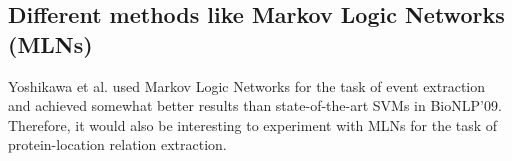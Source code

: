 \subsection{Different methods like Markov Logic Networks (MLNs)}


Yoshikawa et al. used Markov Logic Networks \cite{yoshikawa2011coreference} for the task of event extraction and achieved somewhat better results than state-of-the-art SVMs in BioNLP'09. Therefore, it would also be interesting to experiment with MLNs for the task of protein-location relation extraction.
